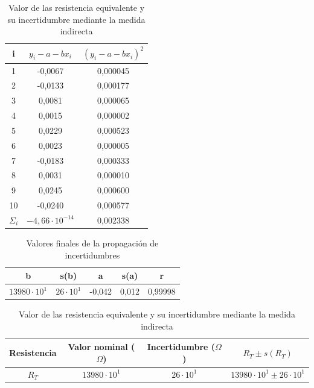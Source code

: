 \documentclass[10pt,a4paper]{article}
\begin{document}
\begin{table}[h] %
\begin{center}
\begin{tabular}{| c | c | c |  }
\hline

i & $y_i -a -bx_i$ & $(y_i -a -bx_i)^2$ 
  \\ \hline
1 & -0,0067 & 0,000045
  \\ 
2 & -0,0133 & 0,000177 
  \\ 
3 & 0,0081 & 0,000065  
  \\ 
4 & 0,0015 & 0,000002  
  \\ 
5 & 0,0229 & 0,000523  
  \\ 
6 & 0,0023 & 0,000005  
  \\ 
7 & -0,0183 & 0,000333 
  \\ 
8 & 0,0031 & 0,000010  
  \\ 
9 & 0,0245 & 0,000600  
  \\ 
  10 & -0,0240 & 0,000577 
  \\ \hline
$\Sigma_i$ & $-4,66 \cdot 10^{-14}$ & 0,002338 \\  \hline
\end{tabular}

\label{tab: medida indirecta incertidumbres valores}
\caption{ Valor de las resistencia equivalente y su incertidumbre mediante la medida indirecta}
\end{center}
\end{table}

\begin{table}[h!]
\begin{center}
\begin{tabular}{| c | c | c | c | c |} \hline
b & s(b) & a & s(a) & r \\ \hline
$13980 \cdot 10^1 $& $26 \cdot 10^1$  & -0,042 & 0,012 & 0,99998 \\ \hline
\end{tabular}
\caption{Valores finales de la propagación de incertidumbres}
\end{center}
\end{table}


\begin{table}[h!] %
\begin{center}
\begin{tabular}{| c | c | c | c | }
\hline

Resistencia & Valor nominal ($\Omega$) & Incertidumbre ($\Omega$) & $R_T \pm s(R_T)$\\ \hline
$R_T$ & $13980 \cdot 10^1 $ & $26 \cdot 10^1 $ & $13980 \cdot 10^1 \pm 26 \cdot 10^1 $ \\ \hline
\end{tabular}
\caption{ Valor de las resistencia equivalente y su incertidumbre mediante la medida indirecta}
\end{center}
\end{table}
\end{document}
